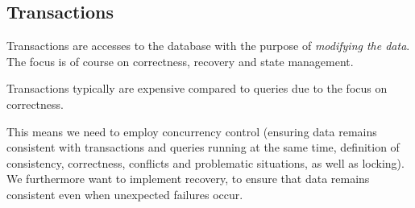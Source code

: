 \subsection{Transactions}
Transactions are accesses to the database with the purpose of \textit{modifying the data}.
The focus is of course on correctness, recovery and state management.

Transactions typically are expensive compared to queries due to the focus on correctness.

This means we need to employ concurrency control (ensuring data remains consistent with transactions and queries running at the same time,
definition of consistency, correctness, conflicts and problematic situations, as well as locking).
We furthermore want to implement recovery, to ensure that data remains consistent even when unexpected failures occur.
